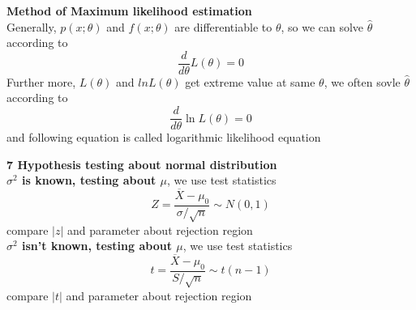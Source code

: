 \documentclass[10pt,a4paper,oneside]{beamer}
\begin{document}
\begin{frame}
\vspace{0.3cm}
{\bfseries Method of Maximum likelihood estimation} 
\vspace{0.3cm}
\\Generally, $p(x;\theta)$ and $f(x;\theta)$ are differentiable to $\theta$, so we can solve $\hat{\theta}$ according to
\[
\frac{d}{d \theta} L(\theta)=0
\]
Further more, $L(\theta)$  and $lnL(\theta)$ get extreme value at same $\theta$, we often sovle $\hat{\theta}$ according to
\[
\frac{d}{d \theta} \ln L(\theta)=0
\]
and following equation is called logarithmic likelihood equation
\end{frame}
\begin{frame}
\vspace{0.3cm}
{\bfseries 7 Hypothesis testing about normal distribution} 
\vspace{0.2cm}
\\{\bfseries $\sigma^2$ is known, testing about $\mu$}, we use test statistics
\[
Z=\frac{\overline{X}-\mu_{0}}{\sigma / \sqrt{n}} \sim N(0,1)
\]
compare $|z|$ and parameter about rejection region
\vspace{0.2cm}
\\{\bfseries $\sigma^2$ isn't known, testing about $\mu$}, we use test statistics
\[
t=\frac{\overline{X}-\mu_{0}}{S / \sqrt{n}} \sim t(n-1)
\]
compare $|t|$ and parameter about rejection region
\end{frame}
\end{document}
